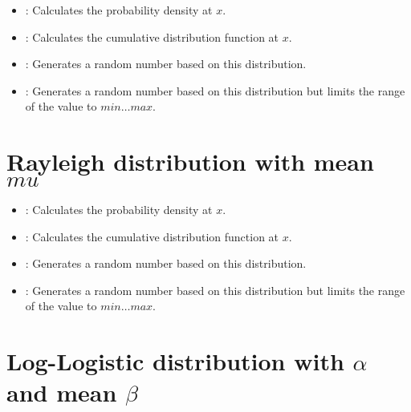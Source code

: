 \begin{itemize}

\item
{}:
Calculates the probability density at $x$.

\item
{}:
Calculates the cumulative distribution function at $x$.

\item
{}:
Generates a random number based on this distribution.

\item
{}:
Generates a random number based on this distribution but limits the range of the value to $min\ldots max$.

\end{itemize}



\section{Rayleigh distribution with mean \texorpdfstring{$mu$}{mu}}

\begin{itemize}

\item
{}:
Calculates the probability density at $x$.

\item
{}:
Calculates the cumulative distribution function at $x$.

\item
{}:
Generates a random number based on this distribution.

\item
{}:
Generates a random number based on this distribution but limits the range of the value to $min\ldots max$.

\end{itemize}



\section{Log-Logistic distribution with \texorpdfstring{$\alpha$}{alpha} and mean \texorpdfstring{$\beta$}{beta}}

